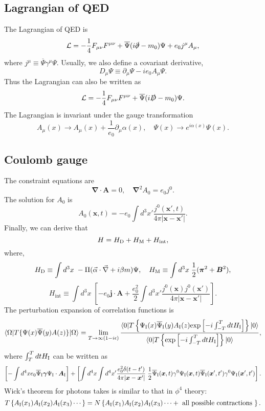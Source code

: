 \subsection{Lagrangian of QED}
\noindent
The Lagrangian of QED is
\[\mathcal{L} = -\frac{1}{4}F_{\mu\nu}F^{\mu\nu} + \overline{\Psi} (i\slashed{\partial}-m_0) \Psi + e_0j^{\mu} A_{\mu},\]
where $j^{\mu} \equiv \overline{\Psi}\gamma^{\mu}\Psi$. Usually, we also define a covariant derivative,
\[D_{\mu}\Psi \equiv \partial_{\mu}\Psi - ie_0A_{\mu}\Psi .\]
Thus the Lagrangian can also be written as
\[\mathcal{L} = -\frac{1}{4}F_{\mu\nu}F^{\mu\nu} + \overline{\Psi} (i\slashed{D}-m_0) \Psi.\]
The Lagrangian is invariant under the gauge transformation
\[A_{\mu}(x) \to A_{\mu}(x) + \frac{1}{e_0}\partial_{\mu}\alpha(x) , \quad \Psi(x) \to e^{i\alpha(x)} \Psi(x).\]

\subsection{Coulomb gauge}
The constraint equations are
\[\bm{\nabla} \cdot \bm{A} = 0 , \quad \bm{\nabla}^2 A_0 = e_0j^0.\]
The solution for $A_0$ is
\[A_0(\bm{x},t) = -e_0 \int d^3 x' \frac{j^0(\bm{x}',t)}{4\pi|\bm{x}-\bm{x}'|}.\]
Finally, we can derive that
\[H = H_{\rm D} + H_{\rm M} + H_{\mathrm{int}},\]
where,
\[H_{\rm D} \equiv \int d^3 x \; -\Pi (\vec{\alpha} \cdot \vec{\nabla} + i \beta m)\Psi , \quad H_{\rm M} \equiv \int d^3x \; \frac{1}{2}(\bm{\pi}^2 + \bm{B}^2),\]
\[H_{\mathrm{int}} \equiv \int d^3x \; \left[-e_0\bm{j}\cdot\bm{A} + \frac{e_0^2}{2} \int d^3x' \frac{j^0(\bm{x}) j^0(\bm{x}')}{4\pi|\bm{x}-\bm{x}'|} \right].\]
The perturbation expansion of correlation functions is
\[\langle \Omega | T \{\Psi(x) \overline{\Psi}(y) A(z) \} | \Omega \rangle = \lim_{T \to \infty(1-i\epsilon)} \frac{\langle 0 | T \left\{ \Psi_{\rm I}(x) \overline{\Psi}_{\rm I}(y) A_{\rm I}(z) \mathrm{exp} \left[ -i \int_{-T}^{T} dt H_{\rm I} \right]\right\} | 0 \rangle}{\langle 0 | T \left\{ \mathrm{exp} \left[ -i \int_{-T}^{T} dt H_{\rm I} \right]\right\} | 0 \rangle},\]
where $\int_{T}^{T} dt H_{\rm I}$ can be written as
\[\left[-\int d^4x e_0\overline{\Psi}_{\rm I}\bm{\gamma}\Psi_{\rm I}\cdot\bm{A}_{\rm I} \right] +\left[ \int d^4x \int d^4x' \frac{e_0^2\delta(t-t')}{4\pi|\bm{x}-\bm{x}'|}\; \frac{1}{2} \overline{\Psi}_{\rm I}(\bm{x},t)\gamma^0 \Psi_{\rm I}(\bm{x},t) \overline{\Psi}_{\rm I}(\bm{x}',t')\gamma^0 \Psi_{\rm I}(\bm{x}',t') \right].\]
Wick's theorem for photons takes is similar to that in $\phi^4$ theory:
\[T \left\{ A_{\rm I}(x_1) A_{\rm I}(x_2)  A_{\rm I}(x_3) \cdots \right\} = N \left\{A_{\rm I}(x_1) A_{\rm I}(x_2)  A_{\rm I}(x_3) \cdots + \mbox{ all possible contractions }\right\} .\]
